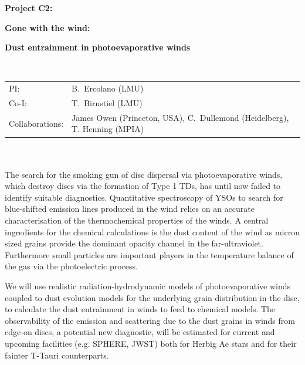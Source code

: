\documentclass[10pt,fleqn,twoside]{article}
\newcommand{\Tcol}{\color{blue}}
\begin{document}
\newpage


\setcounter{page}{1}

\centerline{\huge\bf\Tcol
%
%
%
%
%
 Project C2:}

\centerline{\huge\bf\Tcol Gone with the wind:}
\centerline{\huge\bf\Tcol Dust entrainment in photoevaporative winds}

%
%
%
%
%
\vskip1.0cm


\\
\begin{tabular}{ll}
{\textsf{PI:}}                   & B.~Ercolano (LMU) \\
{\textsf{Co-I:}}                & T.~Birnstiel (LMU)\\
{\textsf{Collaborations:}}      &  James Owen (Princeton, USA),
                                    C.~Dullemond
                                  (Heidelberg), T. Henning (MPIA)\\

\end{tabular}


\vspace{1em}
 \\

\vspace{1em}
\\

The search for the smoking gun of disc dispersal via photoevaporative
winds, which destroy discs via the formation of Type 1 TDs,  has until
now failed to identify suitable diagnostics. Quantitative spectroscopy of
YSOs to search for blue-shifted emission lines produced in the wind
relies on an accurate characterisation of the thermochemical
properties of the winds. A central ingredients for the chemical
calculations is the dust content of the wind as micron sized grains
provide the dominant opacity channel in the far-ultraviolet.
Furthermore small particles are important players in the temperature
balance of the gas via the photoelectric process.  

We will use realistic radiation-hydrodynamic models of
photoevaporative winds coupled to dust evolution models for the
underlying grain distribution in the disc, to calculate the dust
entrainment in winds to feed to chemical models. The observability of
the emission and scattering due to the dust grains in winds from edge-on
discs, a potential new diagnostic, will be estimated for current and
upcoming facilities (e.g. SPHERE, JWST) both for Herbig
Ae stars and for their fainter T-Tauri counterparts.  
\end{document}
